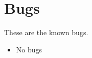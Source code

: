 \chapter{Bugs}\label{bugs}%
%
\setfooter{\thepage}{}{}{}{}{\thepage}

These are the known bugs.

\begin{itemize}\itemsep=0pt
\item No bugs
\end{itemize}
